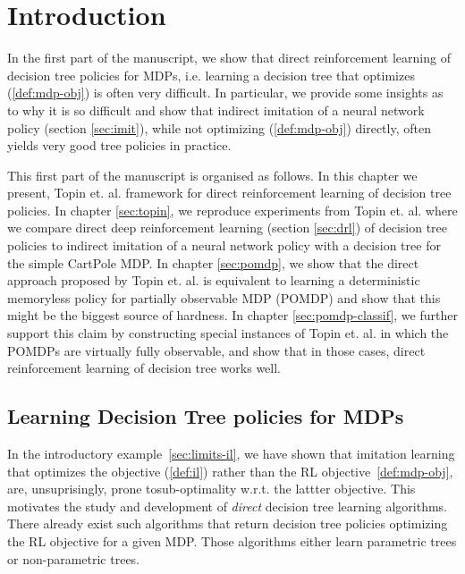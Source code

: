 \chapter{Introduction}\label{sec:intro-pomdp}
In the first part of the manuscript, we show that direct reinforcement learning of decision tree policies for MDPs, i.e. learning a decision tree that optimizes (\ref{def:mdp-obj}) is often very difficult.
In particular, we provide some insights as to why it is so difficult and show that indirect imitation of a neural network policy (section \ref{sec:imit}), while not optimizing (\ref{def:mdp-obj}) directly, often yields very good tree policies in practice.

This first part of the manuscript is organised as follows.
In this chapter we present, Topin et. al. \cite{topin2021iterative} framework for direct reinforcement learning of decision tree policies.
In chapter \ref{sec:topin}, we reproduce experiments from Topin et. al. where we compare direct deep reinforcement learning (section \ref{sec:drl}) of decision tree policies to indirect imitation of a neural network policy with a decision tree for the simple CartPole MDP.
In chapter \ref{sec:pomdp}, we show that the direct approach proposed by Topin et. al. is equivalent to learning a deterministic memoryless policy for partially observable MDP (POMDP)\cite{POMDP,chap2} and show that this might be the biggest source of hardness.
In chapter \ref{sec:pomdp-classif}, we further support this claim by constructing special instances of Topin et. al. in which the POMDPs are virtually fully observable, and show that in those cases, direct reinforcement learning of decision tree works well.  

\section{Learning Decision Tree policies for MDPs}\label{related-work-pomdp}
In the introductory example~\ref{sec:limits-il}, we have shown that imitation learning that optimizes the objective (\ref{def:il}) rather than the RL objective~\ref{def:mdp-obj}, are, unsuprisingly, prone tosub-optimality w.r.t. the lattter objective.
This motivates the study and development of \textit{direct} decision tree learning algorithms.
There already exist such algorithms that return decision tree policies optimizing the RL objective for a given MDP.
Those algorithms either learn parametric trees or non-parametric trees.

